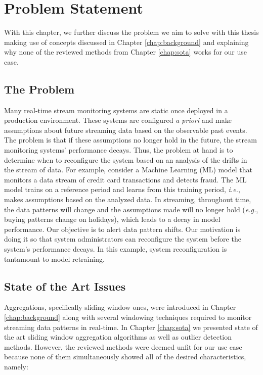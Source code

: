 \chapter{Problem Statement} \label{chap:statement} \minitoc

With this chapter, we further discuss the problem we aim to solve with this thesis making use of concepts discussed in Chapter \ref{chap:background} and explaining why none of the reviewed methods from Chapter \ref{chap:sota} works for our use case.

\section{The Problem} \label{sec:theproblem}
Many real-time stream monitoring systems are static once deployed in a production environment. These systems are configured \textit{a priori} and make assumptions about future streaming data based on the observable past events. The problem is that if these assumptions no longer hold in the future, the stream monitoring systems' performance decays. Thus, the problem at hand is to determine when to reconfigure the system based on an analysis of the drifts in the stream of data. For example, consider a Machine Learning (ML) model that monitors a data stream of credit card transactions and detects fraud. The ML model trains on a reference period and learns from this training period, \textit{i.e.}, makes assumptions based on the analyzed data. In streaming, throughout time, the data patterns will change and the assumptions made will no longer hold (\textit{e.g.}, buying patterns change on holidays), which leads to a decay in model performance. Our objective is to alert data pattern shifts. Our motivation is doing it so that system administrators can reconfigure the system before the system's performance decays. In this example, system reconfiguration is tantamount to model retraining.

\section{State of the Art Issues} \label{sec:sotaissues}
Aggregations, specifically sliding window ones, were introduced in Chapter \ref{chap:background} along with several windowing techniques required to monitor streaming data patterns in real-time. In Chapter \ref{chap:sota} we presented state of the art sliding window aggregation algorithms as well as outlier detection methods. However, the reviewed methods were deemed unfit for our use case because none of them simultaneously showed all of the desired characteristics, namely:

